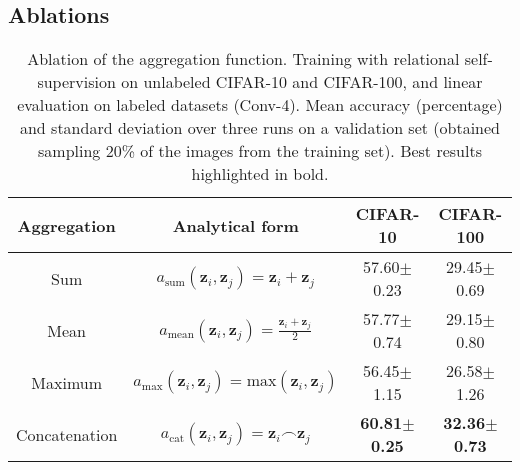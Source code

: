 \documentclass{article}
\begin{document}
\subsection{Ablations} \label{appendix:additional_ablations}
\FloatBarrier

\begin{table}[H]
 \caption{Ablation of the aggregation function. Training with relational self-supervision on unlabeled CIFAR-10 and CIFAR-100, and linear evaluation on labeled datasets (Conv-4). Mean accuracy (percentage) and standard deviation over three runs on a validation set (obtained sampling 20\% of the images from the training set). Best results highlighted in bold.}
 \label{tab:aggregation_comparison}
 \begin{adjustbox}{width=0.65\columnwidth,center}
  \centering
  \begin{tabular}{cccc}
    \toprule
    \textbf{Aggregation} &\textbf{Analytical form} &
    \textbf{CIFAR-10} & \textbf{CIFAR-100} \\
    \midrule
    Sum & $a_{\text{sum}}(\mathbf{z}_i, \mathbf{z}_j) = \mathbf{z}_i + \mathbf{z}_j$ & 
    57.60$\pm$\small{0.23} & 29.45$\pm$\small{0.69} \\
    Mean & $a_{\text{mean}}(\mathbf{z}_i, \mathbf{z}_j) = \frac{\mathbf{z}_i + \mathbf{z}_j}{2}$ & 
    57.77$\pm$\small{0.74} & 29.15$\pm$\small{0.80} \\
    Maximum & $a_{\text{max}}(\mathbf{z}_i, \mathbf{z}_j) = \text{max}(\mathbf{z}_i, \mathbf{z}_j)$ & 
    56.45$\pm$\small{1.15} & 26.58$\pm$\small{1.26} \\
    Concatenation & $a_{\text{cat}}(\mathbf{z}_i, \mathbf{z}_j) =  \mathbf{z}_i \frown \mathbf{z}_j$ 
    & \textbf{60.81$\pm$\small{0.25}} & \textbf{32.36$\pm$\small{0.73}}\\
    \bottomrule
  \end{tabular}
 \end{adjustbox}
\end{table}
\end{document}
